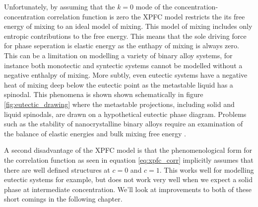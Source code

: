 Unfortunately, by assuming that the $k=0$ mode of the
concentration-concentration correlation function is zero the XPFC model
restricts the its free energy of mixing to an ideal model of mixing. This model
of mixing includes only entropic contributions to the free energy. This means
that the sole driving force for phase seperation is elastic energy as the enthapy
of mixing is always zero. This can be a limitation on modelling a variety of binary
alloy systems, for instance both monotectic and syntectic systems cannot be
modelled without a negative enthalpy of mixing. More subtly, even eutectic systems
have a negative heat of mixing deep below the eutectic point as the metastable
liquid has a spinodal. This phenomena is shown shown schematically in figure
\ref{fig:eutectic_drawing} where the metastable projections, including solid
and liquid spinodals, are drawn on a hypothetical eutectic phase diagram.
Problems such as the stability of nanocrystalline binary alloys require an
examination of the balance of elastic energies and bulk mixing free energy
\cite{MURDOCH13}.

A second disadvantage of the XPFC model is that the phenomenological form for
the correlation function as seen in equation \ref{eq:xpfc_corr} implicitly
assumes that there are well defined structures at $c=0$ and $c=1$. This works
well for modelling eutectic systems for example, but does not work very well
when we expect a solid phase at intermediate concentration. We'll look at 
improvements to both of these short comings in the following chapter.

